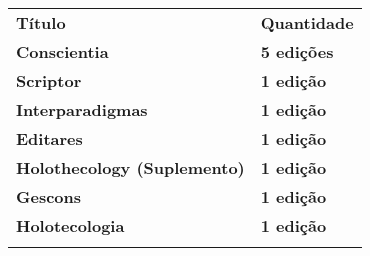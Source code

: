 \begin{longtable}[]{@{}
  >{\raggedright\arraybackslash}p{}
  >{\raggedright\arraybackslash}p{}@{}}
\toprule\noalign{}
\begin{minipage}[b]{\linewidth}\centering
\textbf{Título}
\end{minipage} & \begin{minipage}[b]{\linewidth}\centering
\textbf{Quantidade}
\end{minipage} \\
\begin{minipage}[b]{\linewidth}\raggedright
\textbf{Conscientia}
\end{minipage} & \begin{minipage}[b]{\linewidth}\raggedright
\textbf{5 edições}
\end{minipage} \\
\begin{minipage}[b]{\linewidth}\raggedright
\textbf{Scriptor}
\end{minipage} & \begin{minipage}[b]{\linewidth}\raggedright
\textbf{1 edição}
\end{minipage} \\
\begin{minipage}[b]{\linewidth}\raggedright
\textbf{Interparadigmas}
\end{minipage} & \begin{minipage}[b]{\linewidth}\raggedright
\textbf{1 edição}
\end{minipage} \\
\begin{minipage}[b]{\linewidth}\raggedright
\textbf{Editares}
\end{minipage} & \begin{minipage}[b]{\linewidth}\raggedright
\textbf{1 edição}
\end{minipage} \\
\begin{minipage}[b]{\linewidth}\raggedright
\textbf{Holothecology (Suplemento)}
\end{minipage} & \begin{minipage}[b]{\linewidth}\raggedright
\textbf{1 edição}
\end{minipage} \\
\begin{minipage}[b]{\linewidth}\raggedright
\textbf{Gescons}
\end{minipage} & \begin{minipage}[b]{\linewidth}\raggedright
\textbf{1 edição}
\end{minipage} \\
\begin{minipage}[b]{\linewidth}\raggedright
\textbf{Holotecologia}
\end{minipage} & \begin{minipage}[b]{\linewidth}\raggedright
\textbf{1 edição}
\end{minipage} \\
\midrule\noalign{}
\endhead
\bottomrule\noalign{}
\endlastfoot
\end{longtable}

